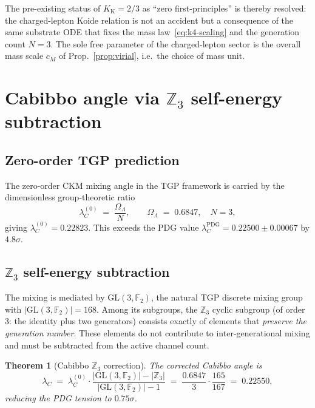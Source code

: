 \documentclass[11pt,a4paper]{article}
\newcommand{\Kkoide}{K_{\mathrm{K}}}
\newcommand{\GLtf}{\mathrm{GL}(3,\mathbb{F}_{2})}
\newcommand{\Zthree}{\mathbb{Z}_{3}}
\newtheorem{theorem}{Theorem}
\begin{document}
\noindent
The pre-existing status of $\Kkoide=2/3$ as ``zero first-principles''
is thereby resolved: the charged-lepton Koide relation is not an
accident but a consequence of the same substrate ODE that fixes the
mass law~\eqref{eq:k4-scaling} and the generation count $N=3$. The
sole free parameter of the charged-lepton sector is the overall mass
scale $c_{M}$ of Prop.~\ref{prop:virial}, i.e.\ the choice of mass
unit.

\section{Cabibbo angle via \texorpdfstring{$\Zthree$}{Z3} self-energy subtraction}\label{sec:cabibbo}

\subsection{Zero-order TGP prediction}

The zero-order CKM mixing angle in the TGP framework is carried by the
dimensionless group-theoretic ratio~\cite{TGP-repo}
\begin{equation}\label{eq:cabibbo-zero}
  \lambda_{C}^{(0)} \;=\; \frac{\Omega_{\Lambda}}{N},
  \qquad
  \Omega_{\Lambda} \;=\; 0.6847,
  \quad N=3,
\end{equation}
giving $\lambda_{C}^{(0)}=0.22823$. This exceeds the PDG value
$\lambda_{C}^{\mathrm{PDG}}=0.22500\pm 0.00067$ by $4.8\sigma$.

\subsection{\texorpdfstring{$\Zthree$}{Z3} self-energy subtraction}

The mixing is mediated by $\GLtf$, the natural TGP discrete mixing
group with $|\GLtf|=168$. Among its subgroups, the $\Zthree$ cyclic
subgroup (of order $3$: the identity plus two generators) consists
exactly of elements that \emph{preserve the generation number}. These
elements do not contribute to inter-generational mixing and must be
subtracted from the active channel count.

\begin{theorem}[Cabibbo $\Zthree$ correction]\label{thm:cabibbo}
The corrected Cabibbo angle is
\begin{equation}\label{eq:cabibbo-corr}
  \lambda_{C} \;=\; \lambda_{C}^{(0)} \cdot
  \frac{|\GLtf|-|\Zthree|}{|\GLtf|-1}
  \;=\; \frac{0.6847}{3}\cdot \frac{165}{167}
  \;=\; 0.22550,
\end{equation}
reducing the PDG tension to $0.75\sigma$.
\end{theorem}
\end{document}
